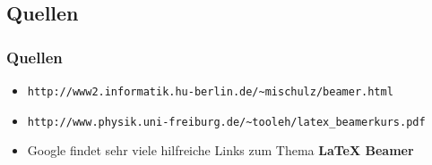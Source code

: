 \documentclass{beamer}
\begin{document}
\subsection{Quellen}

\begin{frame}[fragile]
\frametitle{Quellen}
\begin{itemize}
\item \verb!http://www2.informatik.hu-berlin.de/~mischulz/beamer.html!
\item {\small \verb!http://www.physik.uni-freiburg.de/~tooleh/latex_beamerkurs.pdf!}
\item Google findet sehr viele hilfreiche Links zum Thema \textbf{LaTeX Beamer}
\end{itemize}
\end{frame}
\end{document}
